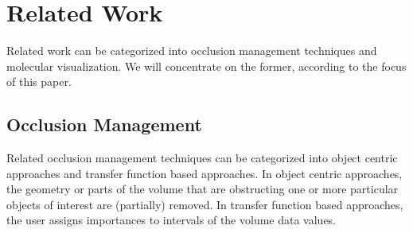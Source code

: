 \section{Related Work}
Related work can be categorized into occlusion management techniques and molecular visualization. We will concentrate on the former, according to the focus of this paper.

\subsection{Occlusion Management}
Related occlusion management techniques can be categorized into object centric approaches and transfer function based approaches. In object centric approaches, the geometry or parts of the volume that are obstructing one or more particular objects of interest are (partially) removed. In transfer function based approaches, the user assigns importances to intervals of the volume data values.

